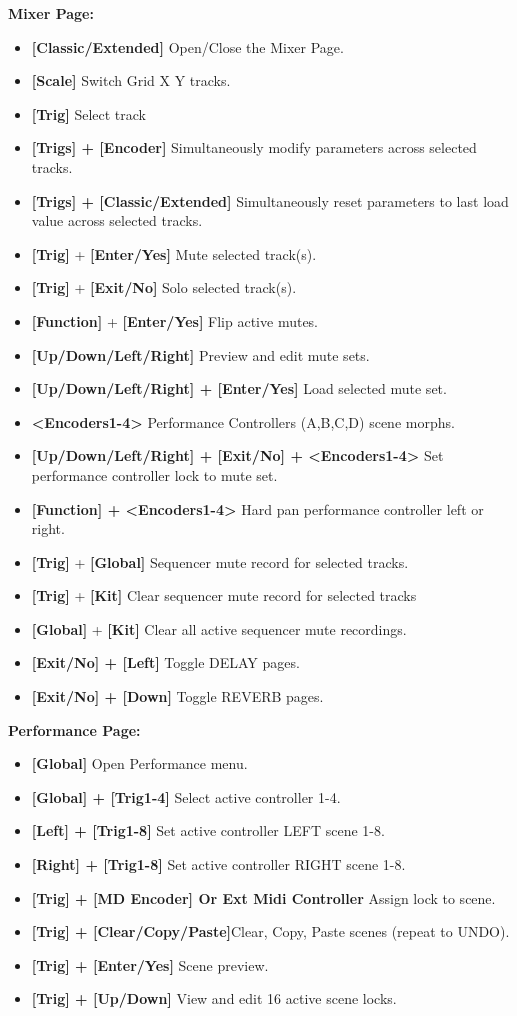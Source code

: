 \textbf{Mixer Page:}
      \begin{itemize}
       \item \textbf{[Classic/Extended]} Open/Close the Mixer Page.
       \item \textbf{[Scale]} Switch Grid X Y tracks.
       \item \textbf{[Trig]} Select track
       \item \textbf{[Trigs] + [Encoder]} Simultaneously modify parameters across selected tracks. 
       \item \textbf{[Trigs] + [Classic/Extended]} Simultaneously reset parameters to last load value across selected tracks.
       \item \textbf{[Trig]} + \textbf{[Enter/Yes]} Mute selected track(s).
      \item \textbf{[Trig]} + \textbf{[Exit/No]} Solo selected track(s).
      \item \textbf{[Function]} + \textbf{[Enter/Yes]} Flip active mutes.
      \item \textbf{[Up/Down/Left/Right]} Preview and edit mute sets.
      \item \textbf{[Up/Down/Left/Right] + [Enter/Yes]} Load selected mute set.
      \item \textbf{<Encoders1-4>} Performance Controllers (A,B,C,D) scene morphs.
      \item \textbf{[Up/Down/Left/Right] + [Exit/No] + <Encoders1-4>} Set performance controller lock to mute set.
      \item \textbf{[Function] + <Encoders1-4>} Hard pan performance controller left or right.
      \item \textbf{[Trig]} + \textbf{[Global]} Sequencer mute record for selected tracks.
      \item \textbf{[Trig]} + \textbf{[Kit]} Clear sequencer mute record for selected tracks
      \item \textbf{[Global]} + \textbf{[Kit]} Clear all active sequencer mute recordings.
      \item \textbf{[Exit/No] + [Left]} Toggle DELAY pages.
      \item \textbf{[Exit/No] + [Down]} Toggle REVERB pages.
       \end{itemize}
\newpage
\textbf{Performance Page:}
\begin{itemize}
      \item \textbf{[Global]} Open Performance menu.
      \item \textbf{[Global] + [Trig1-4]} Select active controller 1-4.
      \item \textbf{[Left] + [Trig1-8]} Set active controller LEFT scene 1-8.
      \item \textbf{[Right] + [Trig1-8]} Set active controller RIGHT scene 1-8.
      \item \textbf{[Trig] + [MD Encoder] Or Ext Midi Controller} Assign lock to scene.
      \item \textbf{[Trig] + [Clear/Copy/Paste]}Clear, Copy, Paste scenes (repeat to UNDO).
      \item \textbf{[Trig] + [Enter/Yes]} Scene preview.
      \item \textbf{[Trig] + [Up/Down]} View and edit 16 active scene locks.
      \end{itemize}
